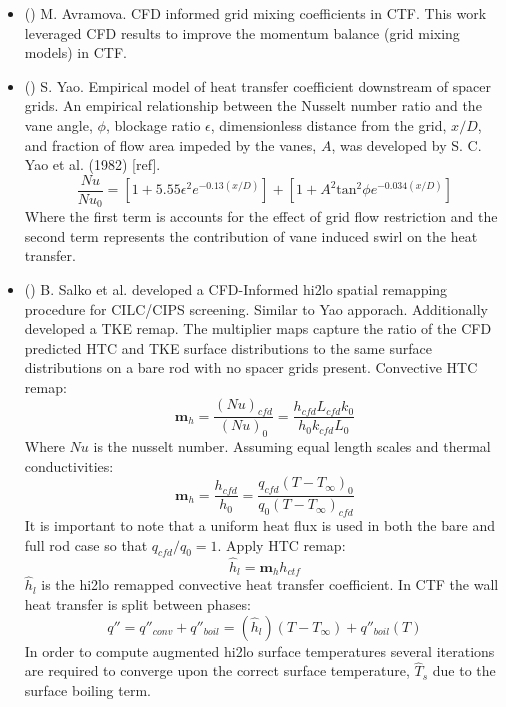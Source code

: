 
\begin{itemize}
    \item (\checkmark) M. Avramova.  CFD informed grid mixing coefficients in CTF.  This work leveraged CFD results to improve the momentum balance (grid mixing models) in CTF. \cite{avramova2007}
    \item (\checkmark) S. Yao.  Empirical model of heat transfer coefficient downstream of spacer grids. \cite{yao82}
    An empirical relationship between the Nusselt number ratio and the vane angle, $\phi$, blockage ratio $\epsilon$, dimensionless distance from the grid, $x/D$, and fraction of flow area impeded by the vanes, $A$, was developed by S. C. Yao et al. (1982) [ref].
\begin{equation}
\frac{Nu}{Nu_0}  = \left[ 1 + 5.55 \epsilon^2 e^{-0.13(x/D)}\right] + \left[ 1 + A^2\mathrm{tan}^2\phi e^{-0.034(x/D)} \right]
\end{equation}
Where the first term is accounts for the effect of grid flow restriction and the second term represents the contribution of vane induced swirl on the heat transfer.

    \item (\checkmark) B. Salko et al. developed a CFD-Informed hi2lo spatial remapping procedure for CILC/CIPS screening. \cite{salko17}
    Similar to Yao apporach.  Additionally developed a TKE remap.
    The multiplier maps capture the ratio of the CFD predicted HTC and TKE surface distributions to the same surface distributions on a bare rod with no spacer grids present.
    Convective HTC remap:
    \begin{equation}
        \mathbf m_h = \frac{(Nu)_{cfd}}{(Nu)_{0}} = \frac{h_{cfd} L_{cfd} k_{0} }{h_{0}k_{cfd} L_{0}}
    \end{equation}
    Where $Nu$ is the nusselt number.  Assuming equal length scales and thermal conductivities:
    \begin{equation}
        \mathbf m_h = \frac{h_{cfd}}{h_{0}} = \frac{q_{cfd}(T-T_\infty)_{0}}{q_{0}(T-T_\infty)_{cfd}}
    \end{equation}
    It is important to note that a uniform heat flux is used in both the bare and full rod case so that $q_{cfd}/q_0 =1 $.
    Apply HTC remap:
    \begin{equation}
        \hat h_{l} = \mathbf m_h h_{ctf}
    \end{equation}
    $\hat h_l$ is the hi2lo remapped convective heat transfer coefficient.  In CTF the wall heat transfer is split between phases:
    \begin{equation}
        q'' = q''_{conv} + q''_{boil} = (\hat h_l)(T-T_{\infty}) + q''_{boil}(T)
    \end{equation}
    In order to compute augmented hi2lo surface temperatures
    several iterations are required to converge upon the correct surface temperature, $\hat T_s$ due to the surface boiling term.


\end{itemize}
